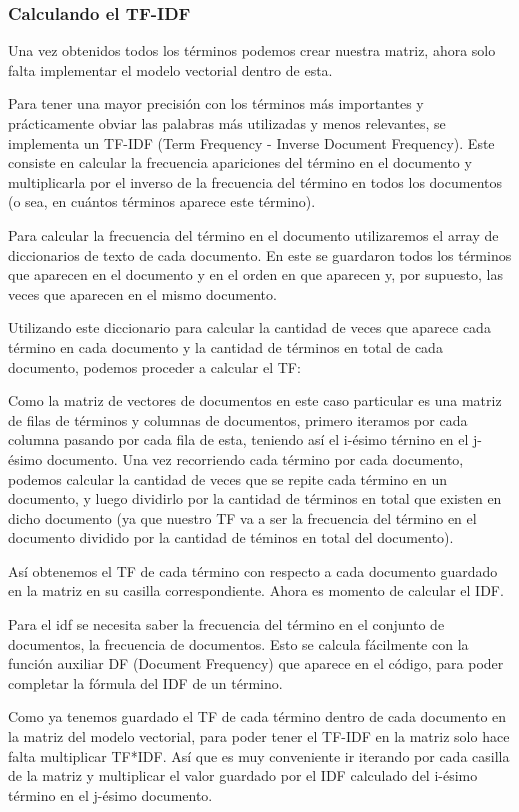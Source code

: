 \documentclass[12pt]{article}
\begin{document}
\subsubsection*{Calculando el TF-IDF}
	Una vez obtenidos todos los términos podemos crear nuestra matriz, ahora solo falta implementar el modelo vectorial dentro de esta.
	
	Para tener una mayor precisión con los términos más importantes y prácticamente obviar las palabras más utilizadas y menos relevantes, se implementa un TF-IDF (Term Frequency - Inverse Document Frequency).
	Este consiste en calcular la frecuencia apariciones del término en el documento y multiplicarla por el inverso de la frecuencia del término en todos los documentos (o sea, en cuántos términos aparece este término).
	
	Para calcular la frecuencia del término en el documento utilizaremos el array de diccionarios de texto de cada documento.
	 En este se guardaron todos los términos que aparecen en el documento y en el orden en que aparecen y, por supuesto, las veces que aparecen en el mismo documento. 
	 
	Utilizando este diccionario para calcular la cantidad de veces que aparece cada término en cada documento y la cantidad de términos en total de cada documento, podemos proceder a calcular el TF:
	
	Como la matriz de vectores de documentos en este caso particular es una matriz de filas de términos y columnas de documentos, primero iteramos por cada columna pasando por cada fila de esta, teniendo así el i-ésimo térnino en el j-ésimo documento.
	Una vez recorriendo cada término por cada documento, podemos calcular la cantidad de veces que se repite cada término en un documento, y luego dividirlo por la cantidad de términos en total que existen en dicho documento (ya que nuestro TF va a ser la frecuencia del término en el documento dividido por la cantidad de téminos en total del documento).
	
	Así obtenemos el TF de cada término con respecto a cada documento guardado en la matriz en su casilla correspondiente.
	Ahora es momento de calcular el IDF.
	
	Para el idf se necesita saber la frecuencia del término en el conjunto de documentos, la frecuencia de documentos.
	Esto se calcula fácilmente con la función auxiliar DF (Document Frequency) que aparece en el código, para poder completar la fórmula del IDF de un término.
	
	Como ya tenemos guardado el TF de cada término dentro de cada documento en la matriz del modelo vectorial, para poder tener el TF-IDF en la matriz solo hace falta multiplicar TF*IDF.
	Así que es muy conveniente ir iterando por cada casilla de la matriz y multiplicar el valor guardado por el IDF calculado del i-ésimo término en el j-ésimo documento.
	
\end{document}
